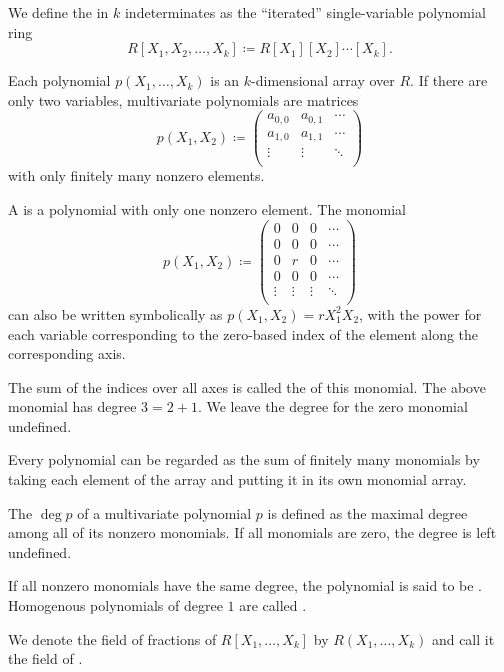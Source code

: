 \begin{definition}\label{def:multivariate_polynomial}
  We define the  in \( k \) indeterminates as the \enquote{iterated} single-variable polynomial ring
  \begin{equation*}
    R[X_1, X_2, \ldots, X_k] \coloneqq R[X_1][X_2] \cdots [X_k].
  \end{equation*}

  Each polynomial \( p(X_1, \ldots, X_k) \) is an \( k \)-dimensional array over \( R \). If there are only two variables, multivariate polynomials are matrices
  \begin{equation*}
    p(X_1, X_2) \coloneqq \begin{pmatrix}
      a_{0,0} & a_{0,1} & \cdots \\
      a_{1,0} & a_{1,1} & \cdots \\
      \vdots  & \vdots  & \ddots \\
    \end{pmatrix}
  \end{equation*}
  with only finitely many nonzero elements.

  A  is a polynomial with only one nonzero element. The monomial
  \begin{equation*}
    p(X_1, X_2) \coloneqq \begin{pmatrix}
      0       & 0       & 0       & \cdots \\
      0       & 0       & 0       & \cdots \\
      0       & r       & 0       & \cdots \\
      0       & 0       & 0       & \cdots \\
      \vdots  & \vdots  & \vdots  & \ddots \\
    \end{pmatrix}
  \end{equation*}
  can also be written symbolically as \( p(X_1, X_2) = r X_1^2 X_2 \), with the power for each variable corresponding to the zero-based index of the element along the corresponding axis.

  The sum of the indices over all axes is called the  of this monomial. The above monomial has degree \( 3 = 2 + 1 \). We leave the degree for the zero monomial undefined.

  Every polynomial can be regarded as the sum of finitely many monomials by taking each element of the array and putting it in its own monomial array.

  The  \( \deg p \) of a multivariate polynomial \( p \) is defined as the maximal degree among all of its nonzero monomials. If all monomials are zero, the degree is left undefined.

  If all nonzero monomials have the same degree, the polynomial is said to be . Homogenous polynomials of degree \( 1 \) are called .
\end{definition}

\begin{definition}\label{def:rational_algebraic_function}
  We denote the field of fractions of \( R[X_1, \ldots, X_k] \) by \( R(X_1, \ldots, X_k) \) and call it the field of .
\end{definition}
